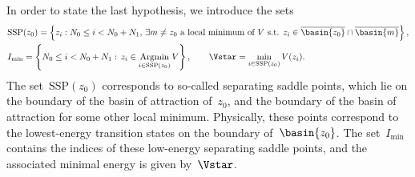         In order to state the last hypothesis, we introduce the sets 
        \begin{equation}
            \label{03:eq:low_energy_saddles}
            \begin{aligned}
                &\mathrm{SSP}(z_0) = \left\{z_i: N_0\leq i < N_0+N_1,\,\exists{m\neq z_0}\text{ a local minimum of }V\text{ s.t. } z_i\in \overline{\basin{z_0}}\cap\overline{\basin{m}}\right\},\\
                &I_{\min} = \left\{N_0\leq i < N_0+N_1:\, z_i\in\underset{i\in \mathrm{SSP}(z_0)}{\mathrm{Argmin}}\, V\right\},\qquad \Vstar = \underset{i\in \mathrm{SSP}(z_0)}{\min}\, V(z_i).
            \end{aligned}
        \end{equation}
        The set~$\mathrm{SSP}(z_0)$ corresponds to so-called separating saddle points, which lie on the boundary of the basin of attraction of~$z_0$, and the boundary of the basin of attraction for some other local minimum. Physically, these points correspond to the lowest-energy transition states on the boundary of~$\basin{z_0}$.
        The set~$I_{\min}$ contains the indices of these low-energy separating saddle points, and the associated minimal energy is given by~$\Vstar$.

